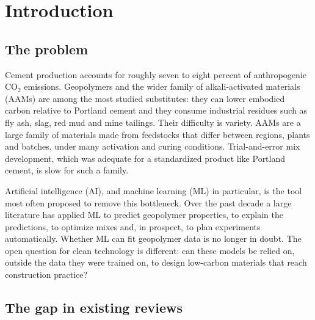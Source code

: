 \documentclass[pdflatex,sn-basic]{sn-jnl}
\begin{document}

\maketitle

\section{Introduction}\label{sec:intro}

\subsection{The problem}

Cement production accounts for roughly seven to eight percent of anthropogenic CO$_2$ emissions. Geopolymers and the wider family of alkali-activated materials (AAMs) are among the most studied substitutes: they can lower embodied carbon relative to Portland cement and they consume industrial residues such as fly ash, slag, red mud and mine tailings. Their difficulty is variety. AAMs are a large family of materials made from feedstocks that differ between regions, plants and batches, under many activation and curing conditions. Trial-and-error mix development, which was adequate for a standardized product like Portland cement, is slow for such a family.

Artificial intelligence (AI), and machine learning (ML) in particular, is the tool most often proposed to remove this bottleneck. Over the past decade a large literature has applied ML to predict geopolymer properties, to explain the predictions, to optimize mixes and, in prospect, to plan experiments automatically. Whether ML can fit geopolymer data is no longer in doubt. The open question for clean technology is different: can these models be relied on, outside the data they were trained on, to design low-carbon materials that reach construction practice?

\subsection{The gap in existing reviews}
\end{document}
